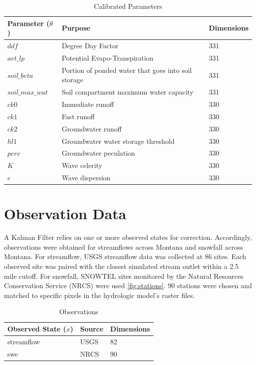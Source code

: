 \begin{table}[]
\caption{Calibrated Parameters} 
\begin{tabular}{lll}
Parameter ($\theta$) & Purpose                                                    & Dimensions  \\ \hline
$ddf$                  & Degree Day Factor                                        & 331 \\
$aet\_lp$              & Potential Evapo-Transpiration                                                      & 331 \\
$soil\_beta$           & Portion of ponded water that goes into soil storage & 331 \\
$soil\_max\_wat$       & Soil compartment maximum water capacity & 331 \\
$ck0$       & Immediate runoff & 330 \\
$ck1$      & Fast runoff & 330 \\
$ck2$       & Groundwater runoff & 330 \\
$hl1$       & Groundwater water storage threshold & 330 \\
$perc$       & Groundwater peculation & 330 \\
$K$       & Wave celerity & 330 \\
$e$       & Wave dispersion & 330 \\
\end{tabular}
\label{tab:t_params}
\end{table}



\section{Observation Data}

A Kalman Filter relies on one or more observed states for correction. Accordingly, observations were obtained for streamflows across Montana and snowfall across Montana. For streamflow, USGS streamflow data was collected at 86 sites. Each observed site was paired with the closest simulated stream outlet within a 2.5 mile cutoff. For snowfall, SNOWTEL sites monitored by the Natural Resources Conservation Service (NRCS) were used \ref{fig:stations}. 90 stations were chosen and matched to specific pixels in the hydrologic model's raster files.


\begin{table}[]
\caption{Observations} 
\begin{tabular}{lll}
Observed State ($x$) & Source                              & Dimensions  \\ \hline
streamflow  & USGS & 82   \\
swe         & NRCS & 90
\end{tabular}
\label{tab:obs}
\end{table}

